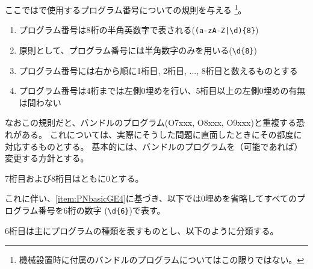 


ここでは\DMname で使用するプログラム番号についての規則を与える
\footnote{機械設置時に付属のバンドルのプログラムについてはこの限りではない。}。



\begin{enumerate}[label=\Roman*., ref=\Roman*]
\item プログラム番号は8桁の半角英数字で表される(\verb+(a-zA-Z|\d){8}+)
\item 原則として、プログラム番号には半角数字のみを用いる(\verb|\d{8}|)
\item プログラム番号には右から順に1桁目, 2桁目, ..., 8桁目と数えるものとする
\item\label{item:PNbasicGE4}プログラム番号は4桁までは左側0埋めを行い、5桁目以上の左側0埋めの有無は問わない
\end{enumerate}
\begin{hosoku}
なおこの規則だと、バンドルのプログラム(O7xxx, O8xxx, O9xxx)と重複する恐れがある。
これについては、実際にそうした問題に直面したときにその都度に対応するものとする。
基本的には、バンドルのプログラムを（可能であれば）変更する方針とする。
\end{hosoku}


7桁目および8桁目はともに0とする。

これに伴い、\ref{item:PNbasicGE4}に基づき、以下では0埋めを省略してすべてのプログラム番号を6桁の数字 (\verb|\d{6}|)で表す。


\clearpage
6桁目は主にプログラムの種類を表すものとし、以下のように分類する。

